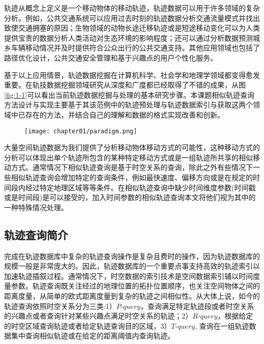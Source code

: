 轨迹从概念上定义是一个移动物体的移动轨迹，轨迹数据可以用于许多领域的复杂分析。例如，公共交通系统可以应用过去时刻的轨迹数据分析交通流量模式并找出致使交通拥塞的原因；生物领域的动物长途迁移轨迹或是短途移动变化可以为人类提供宝贵的数据分析人类活动对生态环境的影响程度；还可以通过分析数据预测城乡车辆移动情况并及时提供符合公众出行的公共交通支持。其他应用领域也包括了路径优化设计，公共交通安全管理和基于兴趣点的用户个性化服务。

基于以上应用情景，轨迹数据挖掘在计算机科学、社会学和地理学领域都变得愈发重要。在轨技数据挖掘领域研究从深度和广度都已经取得了不错的成果，从图\ref{fig:1-1}\cite{zheng2015trajectory}可以看出当前轨迹数据挖掘与处理的基本研究步骤。本课题相似轨迹查询方法设计与实现主要基于其该范例中的轨迹预处理与轨迹数据索引与获取这两个领域中已存在的方法，并结合自己的理解和数据的格式实现改善和创新。

\begin{figure}[!htp]
  \centering
  \texttt{[image: chapter01/paradigm.png]}
\end{figure}

大量空间轨迹数据为我们提供了分析移动物体移动方式的可能性，这种移动方式的分析可以体现出单个轨迹所包含的某种特定移动方式或是一组轨迹所共享的相似移动方式。通常情况下相似轨迹查询是基于时空关系的查询，除此之外有些情况下一些相似轨迹查询会增加特定的查询条件，例如最快速度、偏移方向或是在规定的时间段内经过特定地理区域等等条件。在相似轨迹查询中缺少时间维度参数(时间戳或是时间段)是可以接受的，加入时间参数的相似轨迹查询本文将他们视为其中的一种特殊情况处理。
\\

\subsection{轨迹查询简介}
\label{sec:requirements}
完成在轨迹数据库中复杂的轨迹查询操作是复杂且费时的操作，因为轨迹数据库的规模一般是非常庞大的。因此，轨迹数据库的一个重要点事支持高效的轨迹索引以加速轨迹插叙过程。通常情况下，时空数据的索引技术是空间数据索引辅以时间度量参数。轨迹查询\cite{zheng2011computing}既关注经过的地理位置的拓扑位置顺序，也关注空间物体之间的距离度量，从简单的欧式距离度量到复杂的轨迹之间相似性。从大体上说，如今的轨迹查询依照时空关系分为三类:1）$P$-$query$，查询满足特定轨迹段或者时空关系的兴趣点或者查询针对某些兴趣点满足时空关系的轨迹；2）$R$-$query$，根据给定的时空区域查询轨迹或者给定轨迹查询目的区域，3）$T$-$query$, 查询在一组轨迹数据集中查询相似轨迹或在给定的距离阈值内查询轨迹。


